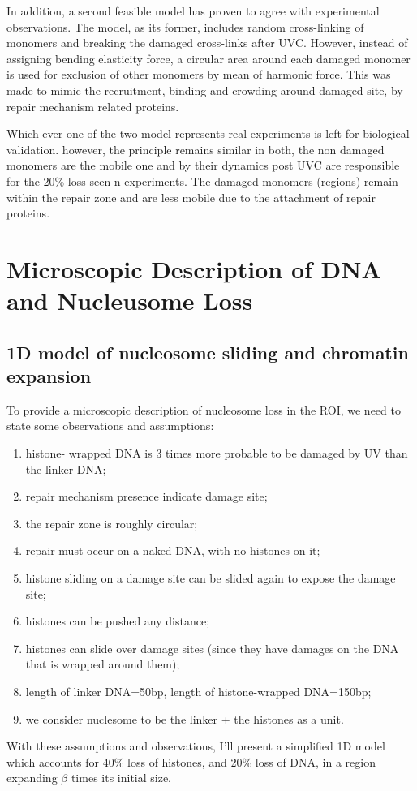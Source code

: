 \documentclass[12pt]{report}
\begin{document}
     In addition, a second feasible model has proven to agree with experimental observations. The model, as its former, includes random cross-linking of monomers and breaking the damaged cross-links after UVC. However, instead of assigning bending elasticity force, a circular area around each damaged monomer is used for exclusion of other monomers by mean of harmonic force. This was made to mimic the recruitment, binding and crowding around damaged site, by repair mechanism related proteins.
     
          
     Which ever one of the two model represents real experiments is left for biological validation. however, the principle remains similar in both, the non damaged monomers are the mobile one and by their dynamics post UVC are responsible for the 20\% loss seen n experiments. The damaged monomers (regions) remain within the repair zone and are less mobile due to the attachment of repair proteins. 
          
\section{Microscopic Description of DNA and Nucleusome Loss}
\subsection{1D model of nucleosome sliding and chromatin expansion}\label{subsection:1dModelOfNucleosomeSliding}
   To provide a microscopic description of nucleosome loss in the ROI, we need to state some observations and assumptions:
   \begin{enumerate}
   	\itemsep0em
   	\item histone- wrapped DNA is 3 times more probable to be damaged by UV than the linker DNA;
   	\item repair mechanism presence indicate damage site;
   	\item the repair zone is roughly circular;  
   	\item repair must occur on a naked DNA, with no histones on it; 
   	\item histone sliding on a damage site can be slided again to expose the damage site;
   	\item histones can be pushed any distance;
   	\item histones can slide over damage sites (since they have damages on the DNA that is wrapped around them);
   	\item length of linker DNA=50bp, length of histone-wrapped DNA=150bp;
   	\item we consider nuclesome to be the linker + the histones as a unit.   
   \end{enumerate}
   With these assumptions and observations, I'll present a simplified 1D model which accounts for 40\% loss of histones, and 20\% loss of DNA, in a region expanding $\beta$ times its initial size. 
   
\end{document}
